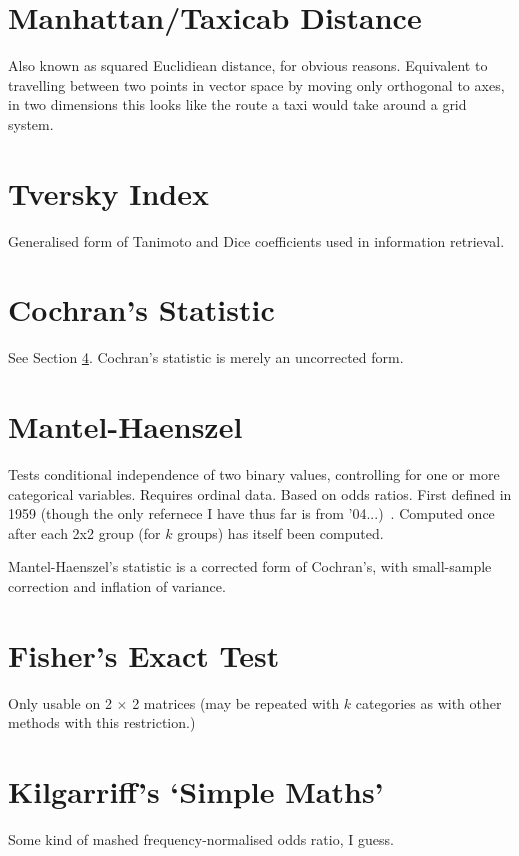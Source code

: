 \documentclass[11pt]{article}
\begin{document}
\section{Manhattan/Taxicab Distance}
\label{section:manhattan}
Also known as squared Euclidiean distance, for obvious reasons.  Equivalent to travelling between two points in vector space by moving only orthogonal to axes, in two dimensions this looks like the route a taxi would take around a grid system.




\section{Tversky Index}
Generalised form of Tanimoto and Dice coefficients used in information retrieval.



\section{Cochran's Statistic}
See Section \ref{section:mantelhaenszel}.  Cochran's statistic is merely an uncorrected form.

\section{Mantel-Haenszel}
\label{section:mantelhaenszel}
Tests conditional independence of two binary values, controlling for one or more categorical variables.  Requires ordinal data.  Based on odds ratios.  First defined in 1959 {\color{red} (though the only refernece I have thus far is from '04...)}~\cite{mantel2004statistical}.  Computed once after each 2x2 group (for $k$ groups) has itself been computed.

Mantel-Haenszel's statistic is a corrected form of Cochran's, with small-sample correction and inflation of variance.


\section{Fisher's Exact Test}
Only usable on 2 $\times$ 2 matrices (may be repeated with $k$ categories as with other methods with this restriction.)


\section{Kilgarriff's `Simple Maths'}
Some kind of mashed frequency-normalised odds ratio, I guess.
\end{document}
